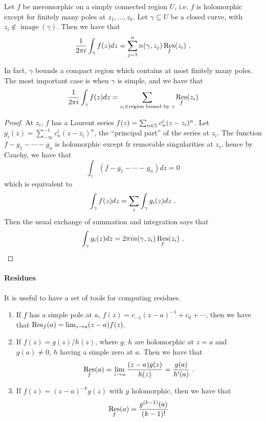 \begin{theorem}
Let $f$ be meromorphic on a simply connected region $U$, i.e. $f$ is holomorphic except for finitely many poles at $z_1, \dotsc, z_k$.
Let $\gamma \subseteq U$ be a closed curve, with $z_i \not\in \mathop{image}(\gamma)$. Then we have that
\[
\frac{1}{2 \pi i}\int_\gamma f(z) dz = \sum_{j = 1}^n n(\gamma, z_j)\operatorname*{Res}_f(z_i) \ \text{.}
\]
\end{theorem}

\begin{remark}
  In fact, $\gamma$ bounds a compact region which contains at most finitely many poles.
The most important case is when $\gamma$ is simple, and we have that
\[
\frac{1}{2 \pi i} \int_\gamma f(z) dz = \sum_{z_i \in \text{region bound by $\gamma$}} \operatorname*{Res}_f (z_i)
\]
\end{remark}

\begin{proof}
  At $z_i$, $f$ has a Laurent series $f(z) = \sum_{n \in \mathbb{Z}} c_n^i (z - z_i)^n$.
Let $g_i(z) = \sum_{-\infty}^{-1} c_n^i(z - z_i)^n$, the ``principal part'' of the series at $z_i$. The function $f - g_1 - \dotsb - g_n$ is holomorphic except fr removable singularities at $z_i$, hence by Cauchy, we have that
\[
\int_\gamma (f - g_1 - \dotsb - g_n) dz = 0
\]
which is equivalent to
\[
\int_\gamma f(z) dz = \sum_i \int_\gamma g_i(z) dz \ \text{.}
\]
Then the usual exchange of summation and integration says that
\[
\int_\gamma g_i(z) dz = 2 \pi i n(\gamma, z_i) \operatorname*{Res}_f (z_i) \ \text{.}
\]
\end{proof}

\paragraph{Residues}

It is useful to have a set of tools for computing residues.
\begin{enumerate}
\item If $f$ has a simple pole at $a$, $f(z) = c_{-1}(z - a)^{-1} + c_0 + \dotsb $, then we have that $\operatorname*{Res}_f (a) = \lim_{z \rightarrow a} (z - a)f(z)$.
\item If $f(z) = g(z)/h(z)$, where $g$, $h$ are holomorphic at $z = a$ and $g(a) \neq 0$, $h$ having a simple zero at $a$.
Then we have that
\[
\operatorname*{Res}_f (a) = \lim_{z \rightarrow a} \frac{(z - a)g(z)}{h(z)} = \frac{g(a)}{h'(a)} \ \text{.}
\]
\item If $f(z) = (z - a)^{-k}g(z)$ with $g$ holomorphic, then we have that
\[
\operatorname*{Res}_f(a) = \frac{g^{(k-1)}(a)}{(k-1)!}
\]
\end{enumerate}

